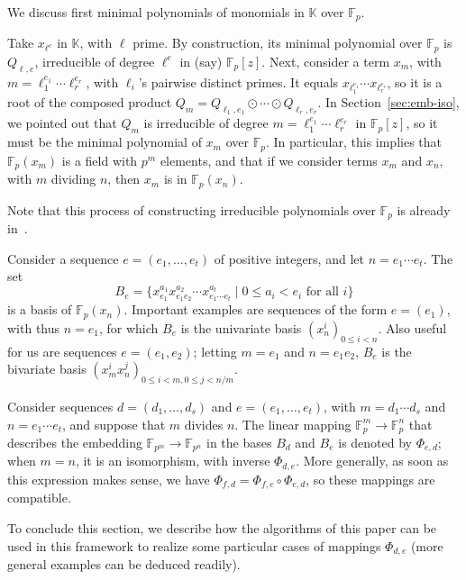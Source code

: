 \documentclass{sig-alternate}
\def\F {\ensuremath{\mathbb{F}}}
\def\K {\ensuremath{\mathbb{K}}}
\newcounter{algo}
\begin{document}
\smallskip{}  We discuss first
minimal polynomials of monomials in $\K$ over $\F_p$.

Take $x_{\ell^{e}}$ in $\K$, with $\ell$ prime. By construction, its
minimal polynomial over $\F_p$ is $Q_{\ell,e}$, irreducible of degree
$\ell^{e}$ in (say) $\F_p[z]$. Next, consider a term $x_m$, with
$m=\ell_1^{e_1}\cdots \ell_r^{e_r}$, with $\ell_i$'s pairwise distinct
primes. It equals $x_{\ell_1^{e_1}} \cdots x_{\ell_r^{e_r}}$,
so it is a root of the composed product $Q_{m}=Q_{\ell_1,e_1} \odot \cdots
\odot Q_{\ell_r,e_r}.$ In Section~\ref{sec:emb-iso}, we pointed out
that $Q_m$ is irreducible of degree $m=\ell_1^{e_1}\cdots
\ell_r^{e_r}$ in $\F_p[z]$, so it must be the minimal polynomial of
$x_m$ over $\F_p$.  In particular, this implies that $\F_p(x_m)$ is a
field with $p^m$ elements, and that if we consider terms $x_m$ and
$x_n$, with $m$ dividing $n$, then $x_m$ is in $\F_p(x_n)$.

Note that this process of constructing irreducible polynomials over
$\F_p$ is already in~\cite{Shoup90,shoup94,couveignes+lercier11}.

\smallskip{}
Consider a sequence $e=(e_1,\dots,e_t)$ of positive integers, and let
$n=e_1 \cdots e_t$. The set
$$B_e = \{ x_{e_1}^{a_1} x_{e_1 e_2}^{a_2} \cdots x_{e_1 \cdots
  e_t}^{a_t} \mid 0 \le a_i < e_i \text{~for all $i$}\}$$ is a basis
of $\F_p(x_n)$. Important examples are sequences of the form $e=(e_1)$,
with thus $n=e_1$, for which $B_e$ is the univariate basis $(x_n^i)_{0
  \le i < n}$. Also useful for us are sequences $e=(e_1,e_2)$; letting
$m=e_1$ and $n=e_1 e_2$, $B_e$ is the bivariate basis $(x_m^i
x_n^j)_{0 \le i < m, 0 \le j < n/m}$.

Consider sequences $d=(d_1,\dots,d_s)$ and $e=(e_1,\dots,e_t)$, with
$m=d_1 \cdots d_s$ and $n=e_1 \cdots e_t$, and suppose that $m$
divides $n$. The linear mapping $\F_p^m \to \F_p^n$ that describes the
embedding $\F_{p^m} \to \F_{p^n}$ in the bases $B_d$ and $B_e$ is
denoted by $\Phi_{e,d}$; when $m=n$, it is an isomorphism, with
inverse $\Phi_{d,e}$. More generally, as soon as this expression makes
sense, we have $\Phi_{f,d} = \Phi_{f,e}\circ \Phi_{e,d}$, so these
mappings are compatible.

To conclude this section, we describe how the algorithms of this paper
can be used in this framework to realize some particular cases of
mappings $\Phi_{d,e}$ (more general examples can be deduced readily).
\end{document}
